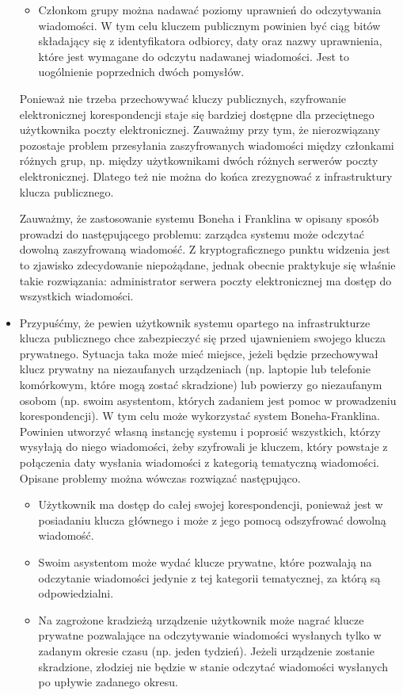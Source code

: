 \begin{itemize}
\begin{itemize}
\item
Członkom grupy można nadawać poziomy uprawnień do odczytywania wiadomości.
W tym celu kluczem publicznym powinien być ciąg bitów składający się
z identyfikatora odbiorcy, daty oraz nazwy uprawnienia,
które jest wymagane do odczytu nadawanej wiadomości.
Jest to uogólnienie poprzednich dwóch pomysłów.
\end{itemize}

\noindent
Ponieważ nie trzeba przechowywać kluczy publicznych,
szyfrowanie elektronicznej korespondencji staje się bardziej dostępne
dla przeciętnego użytkownika poczty elektronicznej.
Zauważmy przy tym, że nierozwiązany pozostaje problem przesyłania
zaszyfrowanych wiadomości między członkami różnych grup,
np. między użytkownikami dwóch różnych serwerów poczty elektronicznej.
Dlatego też nie można do końca zrezygnować
z infrastruktury klucza publicznego.

\noindent
Zauważmy, że zastosowanie systemu Boneha i Franklina w opisany sposób
prowadzi do następującego problemu: zarządca systemu może odczytać
dowolną zaszyfrowaną wiadomość.
Z kryptograficznego punktu widzenia jest to zjawisko zdecydowanie niepożądane,
jednak obecnie praktykuje się właśnie takie rozwiązania:
administrator serwera poczty elektronicznej ma dostęp do wszystkich wiadomości.

\item
Przypuśćmy, że pewien użytkownik
systemu opartego na infrastrukturze klucza publicznego
chce zabezpieczyć się przed ujawnieniem swojego klucza prywatnego.
Sytuacja taka może mieć miejsce,
jeżeli będzie przechowywał klucz prywatny na niezaufanych urządzeniach
(np. laptopie lub telefonie komórkowym, które mogą zostać skradzione)
lub powierzy go niezaufanym osobom
(np. swoim asystentom, których zadaniem jest
pomoc w prowadzeniu korespondencji).
W tym celu może wykorzystać system Boneha-Franklina.
Powinien utworzyć własną instancję systemu
i poprosić wszystkich, którzy wysyłają do niego wiadomości,
żeby szyfrowali je kluczem,
który powstaje z połączenia daty wysłania wiadomości
z kategorią tematyczną wiadomości.
Opisane problemy można wówczas rozwiązać następująco.

\begin{itemize}
\item
Użytkownik ma dostęp do całej swojej korespondencji,
ponieważ jest w posiadaniu klucza głównego
i może z jego pomocą odszyfrować dowolną wiadomość.

\item
Swoim asystentom może wydać klucze prywatne,
które pozwalają na odczytanie wiadomości jedynie z tej kategorii tematycznej,
za którą są odpowiedzialni.

\item
Na zagrożone kradzieżą urządzenie
użytkownik może nagrać klucze prywatne pozwalające na odczytywanie wiadomości
wysłanych tylko w zadanym okresie czasu (np. jeden tydzień).
Jeżeli urządzenie zostanie skradzione,
złodziej nie będzie w stanie odczytać
wiadomości wysłanych po upływie zadanego okresu.
\end{itemize}
\end{itemize}


